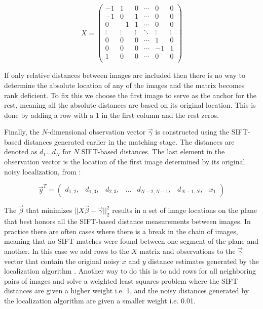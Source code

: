 \message{ !name(paper.tex)}\documentclass[10pt,twocolumn,letterpaper]{article}
\begin{document}
\[
X =
\begin{pmatrix}
  -1 & 1 & 0 & \cdots & 0 & 0\\
  -1 & 0 & 1 & \cdots & 0 & 0\\
  0 & -1 & 1 & \cdots & 0 & 0\\
  \vdots  & \vdots & \vdots & \ddots & \vdots  & \vdots\\
  0 & 0 & 0 & \cdots & 1 & 0 \\
  0 & 0 & 0 & \cdots & -1 & 1 \\
  1 & 0 & 0 & \cdots & 0 & 0 \\
\end{pmatrix}
\]

If only relative distances between images are included then there is
no way to determine the absolute location of any of the images and the
matrix becomes rank deficient. To fix this we choose the first image
to serve as the anchor for the rest, meaning all the absolute
distances are based on its original location. This is done by adding a
row with a $1$ in the first column and the rest zeros.

Finally, the $N$-dimensional observation vector $\vec{\gamma}$ is constructed using the
SIFT-based distances generated earlier in the matching stage. The
distances are denoted as $d_1 \dots d_N$ for $N$ SIFT-based
distances. The last element in the observation vector is the location
of the first image determined by its original noisy localization, from \cite{chen2010indoor, liu2010indoor}:

\[
\vec{y}^T =
\begin{pmatrix}
  d_{1,2}, &d_{1,3}, &d_{2,3}, &\hdots &d_{N-2,N-1}, &d_{N-1,N}, &x_1
\end{pmatrix}
\]

The $\vec{\beta}$ that minimizes $||X \vec{\beta} - \vec{\gamma}||_2^2$ results in a set of
image locations on the plane that best honors all the SIFT-based
distance measurements between images. In practice there are often
cases where there is a break in the chain of images, meaning that no
SIFT matches were found between one segment of the plane and
another. In this case we add rows to the $X$ matrix and observations
to the $\vec{\gamma}$ vector that contain the original noisy $x$ and $y$ distance
estimates generated by the localization algorithm \cite{chen2010indoor, liu2010indoor}. Another way to do
this is to add rows for all neighboring pairs of images and solve a
weighted least squares problem where the SIFT distances are given a
higher weight i.e. 1, and the noisy distances generated by the localization
algorithm \cite{chen2010indoor, liu2010indoor} are given a smaller weight i.e. 0.01.
\end{document}
